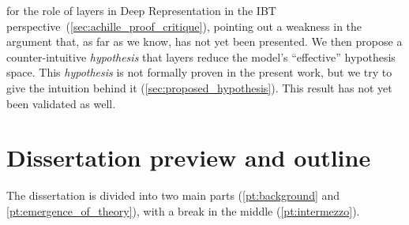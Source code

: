 \documentclass[
  a4paperpaper,
  a4paper,
  12pt,
  twoside,
  brazil,
  british,
  open=right]{scrbook}
\begin{document}
\begin{enumerate}
  for the role of layers in Deep Representation in the {IBT}
  perspective~(\protect\hyperlink{sec:achille_proof_critique}{{[}sec:achille\_proof\_critique{]}}),
  pointing out a weakness in the argument that, as far as we know, has
  not yet been presented. We then propose a counter-intuitive
  \emph{hypothesis} that layers reduce the model's ``effective''
  hypothesis space. This \emph{hypothesis} is not formally proven in the
  present work, but we try to give the intuition behind it
  (\protect\hyperlink{sec:proposed_hypothesis}{{[}sec:proposed\_hypothesis{]}}).
  This result has not yet been validated as well.
\end{enumerate}

\hypertarget{dissertation-preview-and-outline}{%
\section{Dissertation preview and
outline}\label{dissertation-preview-and-outline}}

The dissertation is divided into two main parts
(\protect\hyperlink{pt:background}{{[}pt:background{]}} and
\protect\hyperlink{pt:emergence_of_theory}{{[}pt:emergence\_of\_theory{]}}),
with a break in the middle
(\protect\hyperlink{pt:intermezzo}{{[}pt:intermezzo{]}}).
\end{document}
